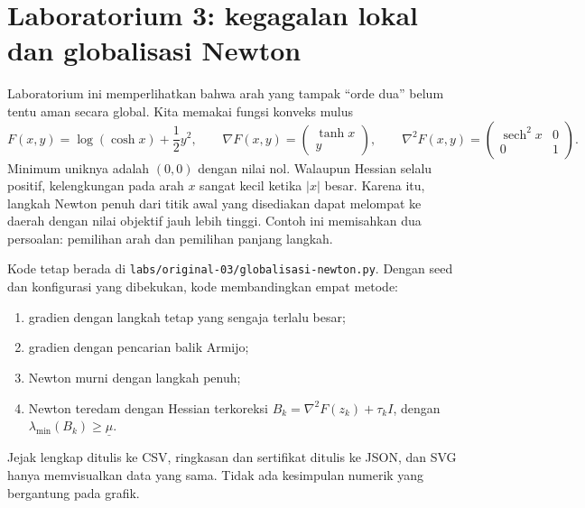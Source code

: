 
\section{Laboratorium 3: kegagalan lokal dan globalisasi Newton}
\label{orig03:lab:globalisasi-newton}

Laboratorium ini memperlihatkan bahwa arah yang tampak ``orde dua'' belum
tentu aman secara global. Kita memakai fungsi konveks mulus
\begin{equation}
  F(x,y)=\log(\cosh x)+\frac12y^2,
  \qquad
  \nabla F(x,y)=\begin{pmatrix}\tanh x\\y\end{pmatrix},
  \qquad
  \nabla^2F(x,y)=
  \begin{pmatrix}\operatorname{sech}^2x&0\\0&1\end{pmatrix}.
  \label{orig03:eq:lab3-model}
\end{equation}
Minimum uniknya adalah $(0,0)$ dengan nilai nol. Walaupun Hessian selalu
positif, kelengkungan pada arah $x$ sangat kecil ketika $|x|$ besar. Karena
itu, langkah Newton penuh dari titik awal yang disediakan dapat melompat ke
daerah dengan nilai objektif jauh lebih tinggi. Contoh ini memisahkan dua
persoalan: pemilihan arah dan pemilihan panjang langkah.

Kode tetap berada di
\texttt{labs/original-03/globalisasi-newton.py}. Dengan seed dan konfigurasi
yang dibekukan, kode membandingkan empat metode:
\begin{enumerate}
  \item gradien dengan langkah tetap yang sengaja terlalu besar;
  \item gradien dengan pencarian balik Armijo;
  \item Newton murni dengan langkah penuh;
  \item Newton teredam dengan Hessian terkoreksi
    $B_k=\nabla^2F(z_k)+\tau_kI$, dengan
    $\lambda_{\min}(B_k)\geq \underline\mu$.
\end{enumerate}
Jejak lengkap ditulis ke CSV, ringkasan dan sertifikat ditulis ke JSON, dan
SVG hanya memvisualkan data yang sama. Tidak ada kesimpulan numerik yang
bergantung pada grafik.

